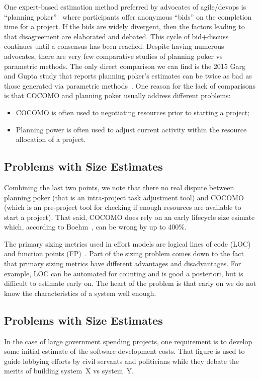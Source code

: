 \documentclass[final,twocolumn,5p]{elsarticle}
\newcommand{\bi}{\begin{itemize}[leftmargin=0.4cm]}
\newcommand{\ei}{\end{itemize}}
\begin{document}
 One expert-based estimation method preferred by advocates of
 agile/devops is ``planning poker''~\cite{molokk08}
 where participants offer anonymous ``bids'' on the
 completion time for a project. If the bids are
 widely divergent, then the factors leading to that
 disagreement are elaborated and debated. This cycle
 of bid+discuss continues until a consensus has been
 reached.  Despite having numerous advocates,
 there are very few comparative studies of planning
 poker vs parametric methods. The only direct
 comparison we can find is the 2015 Garg and Gupta
 study that reports planning poker's estimates can be
 twice as bad as those generated via parametric
 methods~\cite{garg15}. One reason for the lack of
 comparisons is that COCOMO and planning poker
 usually address different problems: \bi
\item COCOMO is often used to negotiating resources prior to starting a project;
\item Planning power is often used to adjust current activity within the resource allocation of a project.
  \ei
  \subsection{Problems with Size Estimates}
Combining the last two points, we note that there no real dispute between planning poker (that is an intra-project
task adjustment tool) and COCOMO (which is an pre-project tool for checking if enough resources are available
to start a project).
That said, COCOMO does rely on an early lifecycle size esimate which, according to Boehm~\cite{boehm81}, can be wrong
by up to 400\%.


  

 The primary sizing metrics used in effort models
 are logical lines of code (LOC)~\cite{Boehm2000a}
 and function points (FP)~\cite{Albrecht1983}.  Part
 of the sizing problem comes down to the fact that
 primary sizing metrics have different advantages
 and disadvantages.  For example, LOC can be
 automated for counting and is good a posteriori,
 but is difficult to estimate early on.  The heart
 of the problem is that early on we do not know the
 characteristics of a system well enough. 

\subsection{Problems with Size Estimates}



In the case of  large government spending projects, one requirement is to develop
some initial   estimate of the software development costs.
That figure is used to guide lobbying efforts by  civil servants and politicians
while they debate the merits of building system~X vs system~Y.
\end{document}
